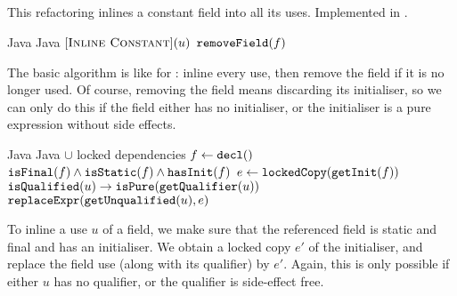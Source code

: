 \subsection{}
This refactoring inlines a constant field into all its uses. Implemented in .

\begin{algorithm}
\caption{$\refactoring{Inline Constant}(f : \type{Field})$}
\begin{algorithmic}[1]
\REQUIRE Java
\ENSURE Java
\medskip
{}
  \STATE $[\textsc{Inline Constant}](u)$
\ENDFOR
{}
  \STATE $\text{\texttt{removeField}}(f)$
\ENDIF
\end{algorithmic}
\end{algorithm}

The basic algorithm is like for : inline every use, then remove the field if it is no longer used. Of course, removing the field means discarding its initialiser, so we can only do this if the field either has no initialiser, or the initialiser is a pure expression without side effects.

\begin{algorithm}
\caption{$\refactoring{Inline Constant}(u : \type{FieldAccess})$}
\begin{algorithmic}[1]
\REQUIRE Java
\ENSURE Java $\cup$ locked dependencies
\medskip
\STATE $f \leftarrow \text{\texttt{decl}}()$
\STATE \assert $\text{\texttt{isFinal}}(f) \wedge \text{\texttt{isStatic}}(f) \wedge \text{\texttt{hasInit}}(f)$
\STATE $e \leftarrow \text{\texttt{lockedCopy}}(\text{\texttt{getInit}}(f))$
\STATE \assert $\text{\texttt{isQualified}}(u) \rightarrow \text{\texttt{isPure}}(\text{\texttt{getQualifier}}(u))$
\STATE $\text{\texttt{replaceExpr}}(\text{\texttt{getUnqualified}}(u), e)$
\end{algorithmic}
\end{algorithm}

To inline a use $u$ of a field, we make sure that the referenced field is static and final and has an initialiser. We obtain a locked copy $e'$ of the initialiser, and replace the field use (along with its qualifier) by $e'$. Again, this is only possible if either $u$ has no qualifier, or the qualifier is side-effect free.
